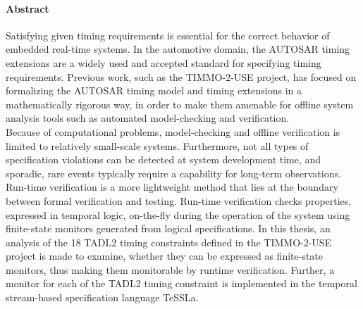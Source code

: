 
\cleardoublepage
\thispagestyle{plain}

\paragraph{Abstract}
Satisfying given timing requirements is essential for the correct behavior of embedded real-time systems.
In the automotive domain, the AUTOSAR timing extensions are a widely used and accepted standard for specifying timing requirements.
Previous work, such as the TIMMO-2-USE project, has focused on formalizing the AUTOSAR timing model and timing extensions in a mathematically rigorous way, in order to make them amenable for offline system analysis tools such as automated model-checking and verification.\\
Because of computational problems, model-checking and offline verification is limited to relatively small-scale systems. Furthermore, not all types of specification violations can be detected at system development time, and sporadic, rare events typically require a capability for long-term observations.
Run-time verification is a more lightweight method that lies at the boundary between formal verification and testing. Run-time verification checks properties, expressed in temporal logic, on-the-fly during the operation of the system using finite-state monitors generated from logical specifications. 
In this thesis, an analysis of the 18 TADL2 timing constraints defined in the TIMMO-2-USE project is made to examine, whether they can be expressed as finite-state monitors, thus making them monitorable by runtime verification. Further, a monitor for each of the TADL2 timing constraint is implemented in the temporal stream-based specification language TeSSLa.

\cleardoublepage
\thispagestyle{plain}

